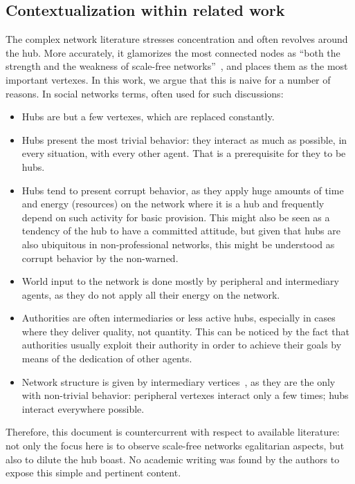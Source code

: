 \documentclass[12pt,fleqn]{article}
\begin{document}
\subsection{Contextualization within related work}\label{sec:rel}
The complex network literature stresses concentration and often revolves around the hub. 
More accurately, it glamorizes the most connected nodes as
``both the strength and the weakness of scale-free networks''~\citep{wikipedia,networks},
and places them as the most important vertexes.
In this work, we argue that this is naive for a number of reasons.
In social networks terms, often used for such discussions:
\begin{itemize}
    \item Hubs are but a few vertexes, which are replaced constantly.
    \item Hubs present the most trivial behavior:
	    they interact as much as possible, in every situation, with every other agent.
		That is a prerequisite for they to be hubs.
    \item Hubs tend to present corrupt behavior,
	    as they apply huge amounts of time and energy (resources)
		on the network where it is a hub and frequently depend on such activity for basic provision.
		This might also be seen as a tendency of the hub to have a committed attitude,
		but given that hubs are also ubiquitous in non-professional networks,
		this might be understood as corrupt behavior by the non-warned.
    \item World input to the network is done mostly by peripheral and intermediary agents,
	    as they do not apply all their energy on the network.
    \item Authorities are often intermediaries or less active hubs,
	    especially in cases where they deliver quality, not quantity.
		This can be noticed by the fact that authorities usually exploit their authority
		in order to achieve their goals by means of the dedication of other agents.
	\item Network structure is given by intermediary vertices~\cite{fabbri1},
	    as they are the only with non-trivial behavior:
		peripheral vertexes interact only a few times; hubs interact everywhere possible.
\end{itemize}

Therefore, this document is countercurrent with respect to available literature:
not only the focus here is to observe scale-free networks egalitarian aspects,
but also to dilute the hub boast.
No academic writing was found by the authors to expose this simple and pertinent content.
\end{document}
